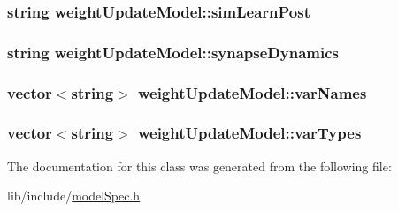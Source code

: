 \hypertarget{classweightUpdateModel_a9ebdfd1b336b3c40403546deb05cbfc9}{
\subsubsection[{sim\+Learn\+Post}]{\setlength{\rightskip}{0pt plus 5cm}string weight\+Update\+Model\+::sim\+Learn\+Post}}\label{classweightUpdateModel_a9ebdfd1b336b3c40403546deb05cbfc9}
\hypertarget{classweightUpdateModel_a8f5c92fc0ca6c1ddf861891bfd751de2}{
\subsubsection[{synapse\+Dynamics}]{\setlength{\rightskip}{0pt plus 5cm}string weight\+Update\+Model\+::synapse\+Dynamics}}\label{classweightUpdateModel_a8f5c92fc0ca6c1ddf861891bfd751de2}
\hypertarget{classweightUpdateModel_a130dc4796aef818562cd9ab112a6dc98}{
\subsubsection[{var\+Names}]{\setlength{\rightskip}{0pt plus 5cm}vector$<$string$>$ weight\+Update\+Model\+::var\+Names}}\label{classweightUpdateModel_a130dc4796aef818562cd9ab112a6dc98}
\hypertarget{classweightUpdateModel_a77fdb9d1287b883d227f1b50fef9889c}{
\subsubsection[{var\+Types}]{\setlength{\rightskip}{0pt plus 5cm}vector$<$string$>$ weight\+Update\+Model\+::var\+Types}}\label{classweightUpdateModel_a77fdb9d1287b883d227f1b50fef9889c}


The documentation for this class was generated from the following file\+:\begin{DoxyCompactItemize}
\item 
lib/include/\hyperlink{modelSpec_8h}{model\+Spec.\+h}\end{DoxyCompactItemize}
